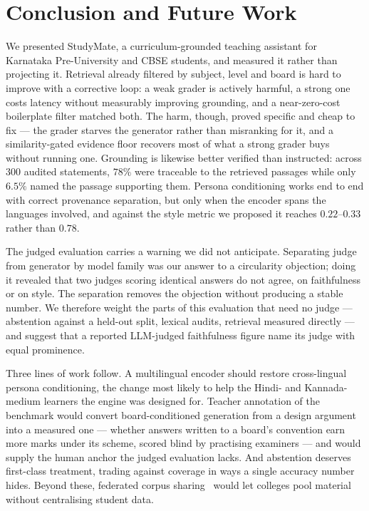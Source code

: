 \documentclass[conference]{IEEEtran}
\begin{document}
\section{Conclusion and Future Work}
\label{sec:future}
We presented StudyMate, a curriculum-grounded teaching assistant for Karnataka
Pre-University and CBSE students, and measured it rather than projecting it.
Retrieval already filtered by subject, level and board is hard to improve with
a corrective loop: a weak grader is actively harmful, a strong one costs
latency without measurably improving grounding, and a near-zero-cost
boilerplate filter matched both. The harm, though, proved specific and cheap to
fix --- the grader starves the generator rather than misranking for it, and a
similarity-gated evidence floor recovers most of what a strong grader buys
without running one. Grounding is likewise better verified than instructed:
across $300$ audited statements, $78\%$ were traceable to the retrieved
passages while only $6.5\%$ named the passage supporting them. Persona
conditioning works end to end with correct provenance separation, but only when
the encoder spans the languages involved, and against the style metric we
proposed it reaches $0.22$--$0.33$ rather than $0.78$.

The judged evaluation carries a warning we did not anticipate. Separating judge
from generator by model family was our answer to a circularity objection; doing
it revealed that two judges scoring identical answers do not agree, on
faithfulness or on style. The separation removes the objection without
producing a stable number. We therefore weight the parts of this evaluation
that need no judge --- abstention against a held-out split, lexical audits,
retrieval measured directly --- and suggest that a reported LLM-judged
faithfulness figure name its judge with equal prominence.

Three lines of work follow. A multilingual encoder should restore
cross-lingual persona conditioning, the change most likely to help the Hindi-
and Kannada-medium learners the engine was designed for. Teacher annotation of
the benchmark would convert board-conditioned generation from a design
argument into a measured one --- whether answers written to a board's
convention earn more marks under its scheme, scored blind by practising
examiners --- and would supply the human anchor the judged evaluation lacks.
And abstention deserves first-class treatment, trading against coverage in ways
a single accuracy number hides. Beyond these, federated corpus
sharing~\cite{fajardo2025} would let colleges pool material without
centralising student data.
\end{document}
